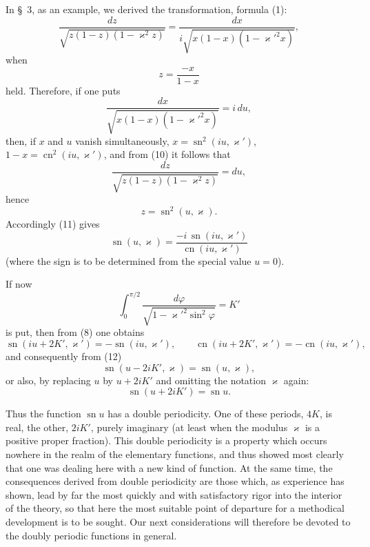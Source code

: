 \documentclass[11pt]{article}
\begin{document}
In \S~3, as an example, we derived the transformation, formula (1):
\begin{equation}
\frac{dz}{\sqrt{z(1-z)(1-\varkappa^2z)}}
=
\frac{dx}{i\sqrt{x(1-x)(1-\varkappa'^2x)}},
\tag{10}
\end{equation}
when
\begin{equation}
z=\frac{-x}{1-x}
\tag{11}
\end{equation}
held. Therefore, if one puts
\[
\frac{dx}{\sqrt{x(1-x)(1-\varkappa'^2x)}}=i\,du,
\]
then, if $x$ and $u$ vanish simultaneously, $x=\operatorname{sn}^2(iu,\varkappa')$, $1-x=\operatorname{cn}^2(iu,\varkappa')$, and from (10) it follows that
\[
\frac{dz}{\sqrt{z(1-z)(1-\varkappa^2z)}}=du,
\]
hence
\[
z=\operatorname{sn}^2(u,\varkappa).
\]
Accordingly (11) gives
\begin{equation}
\operatorname{sn}(u,\varkappa)=
\frac{-i\,\operatorname{sn}(iu,\varkappa')}{\operatorname{cn}(iu,\varkappa')}
\tag{12}
\end{equation}
(where the sign is to be determined from the special value $u=0$).

If now
\[
\int_0^{\pi/2}\frac{d\varphi}{\sqrt{1-\varkappa'^2\sin^2\varphi}}=K'
\]
is put, then from (8) one obtains
\[
\operatorname{sn}(iu+2K',\varkappa')=-\operatorname{sn}(iu,\varkappa'),\qquad
\operatorname{cn}(iu+2K',\varkappa')=-\operatorname{cn}(iu,\varkappa'),
\]
and consequently from (12)
\[
\operatorname{sn}(u-2iK',\varkappa)=\operatorname{sn}(u,\varkappa),
\]
or also, by replacing $u$ by $u+2iK'$ and omitting the notation $\varkappa$ again:
\begin{equation}
\operatorname{sn}(u+2iK')=\operatorname{sn}u.
\tag{13}
\end{equation}

Thus the function $\operatorname{sn}u$ has a double periodicity. One of these periods, $4K$, is real, the other, $2iK'$, purely imaginary (at least when the modulus $\varkappa$ is a positive proper fraction). This double periodicity is a property which occurs nowhere in the realm of the elementary functions, and thus showed most clearly that one was dealing here with a new kind of function. At the same time, the consequences derived from double periodicity are those which, as experience has shown, lead by far the most quickly and with satisfactory rigor into the interior of the theory, so that here the most suitable point of departure for a methodical development is to be sought. Our next considerations will therefore be devoted to the doubly periodic functions in general.
\end{document}
